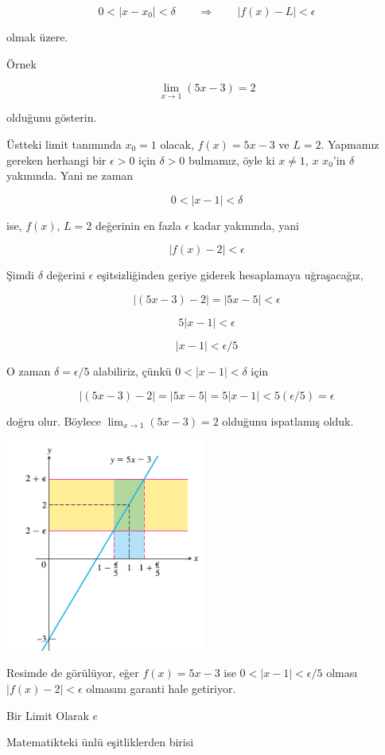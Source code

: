\documentclass[12pt,fleqn]{article}\usepackage{../../common}
\begin{document}
$$ 0 < |x - x_0| < \delta 
\qquad \Rightarrow \qquad
|f(x) - L| < \epsilon
$$

olmak üzere.

Örnek

$$ \lim_{x \to 1}  (5x - 3)  = 2$$

olduğunu gösterin. 

Üstteki limit tanımında $x_0 = 1$ olacak, $f(x) = 5x - 3$ ve $L=2$.
Yapmamız gereken herhangi bir $\epsilon > 0$ için $\delta > 0$ bulmamız,
öyle ki $x \ne 1$, $x$ $x_0$'in $\delta$ yakınında. Yani ne zaman

$$ 0 < |x-1| < \delta $$

ise, $f(x)$, $L=2$ değerinin en fazla $\epsilon$ kadar yakınında, yani

$$ |f(x) - 2| < \epsilon $$

Şimdi $\delta$ değerini $\epsilon$ eşitsizliğinden geriye giderek
hesaplamaya uğraşacağız, 

$$ |(5x-3) - 2| = |5x-5| < \epsilon $$

$$ 5 |x-1| < \epsilon $$

$$ |x-1| < \epsilon / 5 $$

O zaman $\delta = \epsilon / 5$ alabiliriz, çünkü $0 < |x-1| < \delta$ için 

$$ |(5x-3)-2| = |5x-5| = 5|x-1| < 5 (\epsilon/5) = \epsilon $$

doğru olur. Böylece $\lim_{x \to 1} (5x-3) = 2$ olduğunu ispatlamış olduk.

\includegraphics[height=7cm]{limits_03.png}

Resimde de görülüyor, eğer $f(x) = 5x-3$ ise $0 < |x-1| < \epsilon/5$
olması $|f(x)-2| < \epsilon$ olmasını garanti hale getiriyor. 

Bir Limit Olarak $e$

Matematikteki ünlü eşitliklerden birisi
\end{document}
